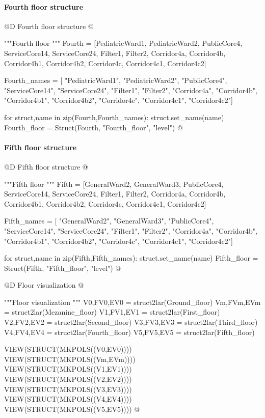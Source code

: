 \documentclass[11pt,oneside]{article}    %
\begin{document}
\paragraph{Fourth floor structure}
@D Fourth floor structure
@{"""Fourth floor """
Fourth = [PediatricWard1, PediatricWard2, PublicCore4, ServiceCore14, ServiceCore24,
    Filter1, Filter2, Corridor4a, Corridor4b, Corridor4b1, Corridor4b2, Corridor4c,
    Corridor4c1, Corridor4c2]

Fourth_names = [ "PediatricWard1", "PediatricWard2", "PublicCore4", "ServiceCore14", 
	"ServiceCore24", "Filter1", "Filter2", "Corridor4a", "Corridor4b", "Corridor4b1", 
	"Corridor4b2", "Corridor4c", "Corridor4c1", "Corridor4c2"]

for struct,name in zip(Fourth,Fourth_names): struct.set_name(name)
Fourth_floor = Struct(Fourth, "Fourth_floor", "level")
@}

\paragraph{Fifth floor structure}
@D Fifth floor structure
@{"""Fifth floor """
Fifth = [GeneralWard2, GeneralWard3, PublicCore4, ServiceCore14, ServiceCore24,
    Filter1, Filter2, Corridor4a, Corridor4b, Corridor4b1, Corridor4b2, Corridor4c,
    Corridor4c1, Corridor4c2]

Fifth_names = [ "GeneralWard2", "GeneralWard3", "PublicCore4", "ServiceCore14", 
	"ServiceCore24", "Filter1", "Filter2", "Corridor4a", "Corridor4b", "Corridor4b1", 
	"Corridor4b2", "Corridor4c", "Corridor4c1", "Corridor4c2"]

for struct,name in zip(Fifth,Fifth_names): struct.set_name(name)
Fifth_floor = Struct(Fifth, "Fifth_floor", "level")
@}



@D Floor visualization
@{"""Floor visualization """
V0,FV0,EV0 = struct2lar(Ground_floor)
Vm,FVm,EVm = struct2lar(Mezanine_floor)
V1,FV1,EV1 = struct2lar(First_floor)
V2,FV2,EV2 = struct2lar(Second_floor)
V3,FV3,EV3 = struct2lar(Third_floor)
V4,FV4,EV4 = struct2lar(Fourth_floor)
V5,FV5,EV5 = struct2lar(Fifth_floor)

VIEW(STRUCT(MKPOLS((V0,EV0))))
VIEW(STRUCT(MKPOLS((Vm,EVm))))
VIEW(STRUCT(MKPOLS((V1,EV1))))
VIEW(STRUCT(MKPOLS((V2,EV2))))
VIEW(STRUCT(MKPOLS((V3,EV3))))
VIEW(STRUCT(MKPOLS((V4,EV4))))
VIEW(STRUCT(MKPOLS((V5,EV5))))
@}
\end{document}
